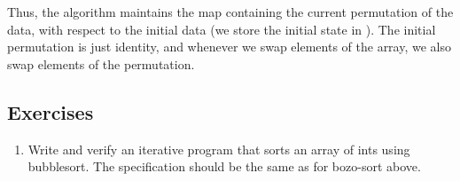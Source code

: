 Thus, the algorithm maintains the map containing the current permutation of
the data, with respect to the initial data (we store the initial state in
).
The initial permutation is just identity, and whenever we swap elements of
the array, we also swap elements of the permutation.

\subsection*{Exercises}
\begin{enumerate}
\item
Write and verify an iterative program that sorts an array of ints using
bubblesort. The specification should be the same as for bozo-sort above.
\end{enumerate}

